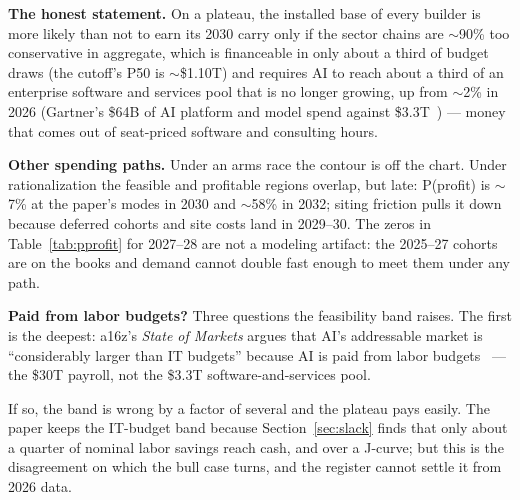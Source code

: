 \documentclass[11pt,letterpaper]{article}
\newcommand{\lead}[1]{{\color{leadwarm}\sffamily\bfseries #1}}
\begin{document}
\lead{The honest statement.} On a plateau, the installed base of every builder is more likely than not to earn its 2030 carry only if the sector chains are $\sim$90\% too conservative in aggregate, which is financeable in only about a third of budget draws (the cutoff's P50 is $\sim$\$1.10T) and requires AI to reach about a third of an enterprise software and services pool that is no longer growing, up from $\sim$2\% in 2026 (Gartner's \$64B of AI platform and model spend against \$3.3T~\cite{ref:gartner_ai_platforms,ref:gartner_it_jul2026}) --- money that comes out of seat-priced software and consulting hours.

\lead{Other spending paths.} Under an arms race the contour is off the chart. Under rationalization the feasible and profitable regions overlap, but late: P(profit) is $\sim$7\% at the paper's modes in 2030 and $\sim$58\% in 2032; siting friction pulls it down because deferred cohorts and site costs land in 2029--30. The zeros in Table~\ref{tab:pprofit} for 2027--28 are not a modeling artifact: the 2025--27 cohorts are on the books and demand cannot double fast enough to meet them under any path.

\lead{Paid from labor budgets?} Three questions the feasibility band raises. The first is the deepest: a16z's \textit{State of Markets} argues that AI's addressable market is ``considerably larger than IT budgets'' because AI is paid from labor budgets~\cite{ref:a16z_som} --- the \$30T payroll, not the \$3.3T software-and-services pool.

If so, the band is wrong by a factor of several and the plateau pays easily. The paper keeps the IT-budget band because Section~\ref{sec:slack} finds that only about a quarter of nominal labor savings reach cash, and over a J-curve; but this is the disagreement on which the bull case turns, and the register cannot settle it from 2026 data.
\end{document}
